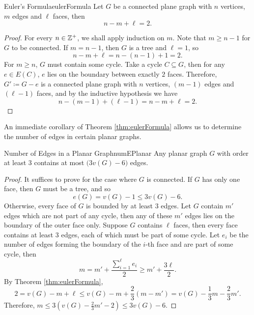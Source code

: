 \documentclass[math]{amznotes}
\theoremstyle{remark}
\newcommand{\0}{\mathbf{0}}
\newcommand{\1}{\mathbf{1}}
\begin{document}
\begin{thmbox}{Euler's Formula}{eulerFormula}
    Let $G$ be a connected plane graph with $n$ vertices, $m$ edges and $\ell$ faces, then 
    \begin{equation*}
        n - m + \ell = 2.
    \end{equation*}
    \tcblower
    \begin{proof}
        For every $n \in \mathbb{Z}^+$, we shall apply induction on $m$. Note that $m \geq n - 1$ for $G$ to be connected. If $m = n - 1$, then $G$ is a tree and $\ell = 1$, so 
        \begin{equation*}
            n - m + \ell = n - (n - 1) + 1 = 2.
        \end{equation*}
        For $m \geq n$, $G$ must contain some cycle. Take a cycle $C \subseteq G$, then for any $e \in E(C)$, $e$ lies on the boundary between exactly $2$ faces. Therefore, $G' \coloneqq G - e$ is a connected plane graph with $n$ vertices, $(m - 1)$ edges and $(\ell - 1)$ faces, and by the inductive hypothesis we have 
        \begin{equation*}
            n - (m - 1) + (\ell - 1) = n - m + \ell = 2.
        \end{equation*}
    \end{proof}
\end{thmbox}
An immediate corollary of Theorem \ref{thm:eulerFormula} allows us to determine the number of edges in certain planar graphs.
\begin{corbox}{Number of Edges in a Planar Graph}{numEPlanar}
    Any planar graph $G$ with order at least $3$ contains at most $\bigl(3v(G) - 6\bigr)$ edges.
    \tcblower
    \begin{proof}
        It suffices to prove for the case where $G$ is connected. If $G$ has only one face, then $G$ must be a tree, and so 
        \begin{equation*}
            e(G) = v(G) - 1 \leq 3v(G) - 6.
        \end{equation*}
        Otherwise, every face of $G$ is bounded by at least $3$ edges. Let $G$ contain $m'$ edges which are not part of any cycle, then any of these $m'$ edges lies on the boundary of the outer face only. Suppose $G$ contains $\ell$ faces, then every face contains at least $3$ edges, each of which must be part of some cycle. Let $e_i$ be the number of edges forming the boundary of the $i$-th face and are part of some cycle, then 
        \begin{equation*}
            m = m' + \frac{\sum_{i = 1}^{\ell}e_i}{2} \geq m' + \frac{3\ell}{2}.
        \end{equation*}
        By Theorem \ref{thm:eulerFormula}, 
        \begin{equation*}
            2 = v(G) - m + \ell \leq v(G) - m + \frac{2}{3}\left(m - m'\right) = v(G) - \frac{1}{3}m - \frac{2}{3}m'.
        \end{equation*}
        Therefore, $m \leq 3\left(v(G) - \frac{2}{3}m' - 2\right) \leq 3v(G) - 6$.
    \end{proof}
\end{corbox}
\end{document}
